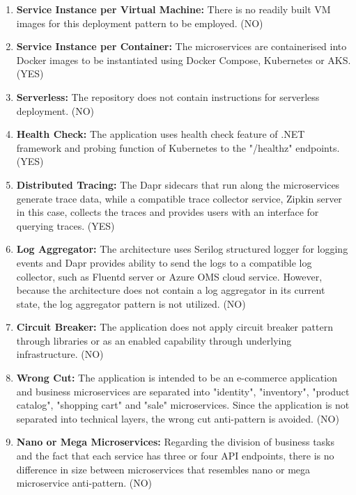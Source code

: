 \documentclass{Configuration_Files/PoliMi3i_thesis}
\begin{document}
\begin{enumerate}
    \item \textbf{Service Instance per Virtual Machine:} There is no readily built VM images for this deployment pattern to be employed. (NO)
    
    \item \textbf{Service Instance per Container:} The microservices are containerised into Docker images to be instantiated using Docker Compose, Kubernetes or AKS. (YES)
    
    \item \textbf{Serverless:} The repository does not contain instructions for serverless deployment. (NO)
    
    \item \textbf{Health Check:} The application uses health check feature of .NET framework and probing function of Kubernetes to the "/healthz" endpoints. (YES)
    
    \item \textbf{Distributed Tracing:} The Dapr sidecars that run along the microservices generate trace data, while a compatible trace collector service, Zipkin server in this case, collects the traces and provides users with an interface for querying traces. (YES)
    
    \item \textbf{Log Aggregator:} The architecture uses Serilog structured logger for logging events and Dapr provides ability to send the logs to a compatible log collector, such as Fluentd server or Azure OMS cloud service.
    However, because the architecture does not contain a log aggregator in its current state, the log aggregator pattern is not utilized. (NO)
    
    \item \textbf{Circuit Breaker:} The application does not apply circuit breaker pattern through libraries or as an enabled capability through underlying infrastructure. (NO)
    
    \item \textbf{Wrong Cut:} The application is intended to be an e-commerce application and business microservices are separated into "identity", "inventory", "product catalog", "shopping cart" and "sale" microservices.
    Since the application is not separated into technical layers, the wrong cut anti-pattern is avoided. (NO)
    
    \item \textbf{Nano or Mega Microservices:} Regarding the division of business tasks and the fact that each service has three or four API endpoints, there is no difference in size between microservices that resembles nano or mega microservice anti-pattern. (NO)
    

\end{enumerate}
\end{document}
